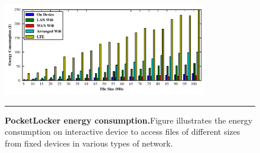 \begin{figure}[t]
  \centering
  \includegraphics[width=0.8\textwidth]{./figures/energyconsumption.pdf}
  
  \vspace*{-0.1in}

  \caption{\small \textbf{PocketLocker energy consumption.}Figure illustrates the energy
  consumption on interactive device to access files of different sizes from
fixed devices in various types of network.}

  \label{fig-evaluation-energy}
  
  \vspace*{0.05in}

  \hrule

  \vspace*{-0.2in}

\end{figure}

